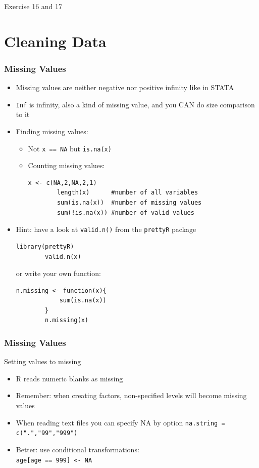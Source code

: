 \documentclass[xcolor={svgnames},10pt,
handout
]{beamer}
\begin{document}
\begin{frame}[standout]
Exercise 16 and 17
\end{frame}


\section{Cleaning Data}
\begin{frame}[fragile]\frametitle{Missing Values}\footnotesize
\begin{itemize}
	\item Missing values are neither negative nor positive infinity like in STATA
	\item \lstinline|Inf| is infinity, also a kind of missing value, and you CAN do size comparison to it
	\item Finding missing values:
	\begin{itemize}\footnotesize
		\item Not \lstinline|x == NA| but \lstinline|is.na(x)|
		\item Counting missing values:
		\begin{lstlisting}[basicstyle=\footnotesize]
		x <- c(NA,2,NA,2,1)
		length(x)      #number of all variables
		sum(is.na(x))  #number of missing values
		sum(!is.na(x)) #number of valid values
		\end{lstlisting}
	\end{itemize}
	\item Hint: have a look at \lstinline|valid.n()| from the \lstinline|prettyR| package
		\begin{lstlisting}[basicstyle=\footnotesize]
		library(prettyR)
		valid.n(x)
		\end{lstlisting}
		 or write your own function:
		\begin{lstlisting}[basicstyle=\footnotesize]
		n.missing <- function(x){
			sum(is.na(x))
		}
		n.missing(x)		
		\end{lstlisting}
	
\end{itemize}
\end{frame}


\begin{frame}[fragile]\frametitle{Missing Values}
Setting values to missing
\begin{itemize}
\item R reads numeric blanks as missing
\item Remember: when creating factors, non-specified levels will become missing values
\item When reading text files you can specify NA by option\newline
\lstinline|na.string = c(".","99","999")|
\item Better: use conditional transformations:\\ \lstinline|age[age == 999] <- NA|
\end{itemize}
\end{frame}
\end{document}

